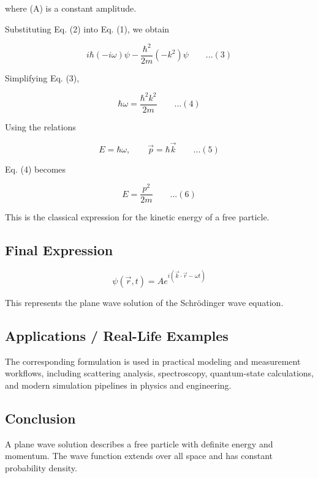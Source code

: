\documentclass[12pt]{report}
\begin{document}
where (A) is a constant amplitude.

Substituting Eq. (2) into Eq. (1), we obtain

\begin{equation*}
i\hbar (-i\omega)\psi
-\frac{\hbar^2}{2m}(-k^2)\psi\qquad ...(3)
\end{equation*}

Simplifying Eq. (3),

\begin{equation*}
\hbar \omega = \frac{\hbar^2 k^2}{2m}\qquad ...(4)
\end{equation*}

Using the relations

\begin{equation*}
E = \hbar \omega,\qquad\vec{p} = \hbar \vec{k}\qquad ...(5)
\end{equation*}

Eq. (4) becomes

\begin{equation*}
E = \frac{p^2}{2m}\qquad ...(6)
\end{equation*}

This is the classical expression for the kinetic energy of a free particle.

\subsection*{Final Expression}

\begin{equation*}
\boxed{\psi(\vec{r},t) = A e^{i(\vec{k}\cdot\vec{r} - \omega t)}}
\end{equation*}

This represents the plane wave solution of the Schrödinger wave equation.

\subsection*{Applications / Real-Life Examples}
The corresponding formulation is used in practical modeling and measurement workflows, including scattering analysis, spectroscopy, quantum-state calculations, and modern simulation pipelines in physics and engineering.

\subsection*{Conclusion}

A plane wave solution describes a free particle with definite energy and momentum. The wave function extends over all space and has constant probability density.
\end{document}
